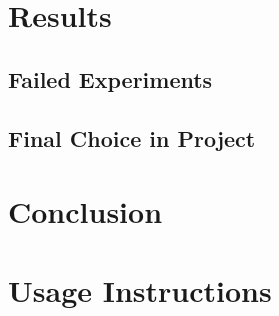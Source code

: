 \documentclass{article}
\begin{document}


\section{Results}
\subsection{Failed Experiments}
\subsection{Final Choice in Project}
\section{Conclusion}

\section{Usage Instructions}




\pagebreak
\nocite{*} %
\printbibliography %
\end{document}
